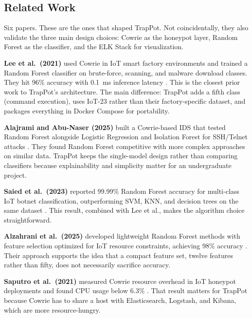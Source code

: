 \subsection{Related Work}
\label{sub:related_work1}

Six papers. These are the ones that shaped TrapPot. Not coincidentally, they also validate the three main design choices: Cowrie as the honeypot layer, Random Forest as the classifier, and the ELK Stack for visualization.

\textbf{Lee et al.\ (2021)} used Cowrie in IoT smart factory environments and trained a Random Forest classifier on brute-force, scanning, and malware download classes. They hit 96\% accuracy with 0.1~ms inference latency \cite{lee2021classification}. This is the closest prior work to TrapPot's architecture. The main difference: TrapPot adds a fifth class (command execution), uses IoT-23 rather than their factory-specific dataset, and packages everything in Docker Compose for portability.

\textbf{Alajrami and Abu-Naser (2025)} built a Cowrie-based IDS that tested Random Forest alongside Logistic Regression and Isolation Forest for SSH/Telnet attacks \cite{alajrami2025aipowered}. They found Random Forest competitive with more complex approaches on similar data. TrapPot keeps the single-model design rather than comparing classifiers because explainability and simplicity matter for an undergraduate project.

\textbf{Saied et al.\ (2023)} reported 99.99\% Random Forest accuracy for multi-class IoT botnet classification, outperforming SVM, KNN, and decision trees on the same dataset \cite{saied2023comparative}. This result, combined with Lee et al., makes the algorithm choice straightforward.

\textbf{Alzahrani et al.\ (2025)} developed lightweight Random Forest methods with feature selection optimized for IoT resource constraints, achieving 98\% accuracy \cite{alzahrani2025lightweight}. Their approach supports the idea that a compact feature set, twelve features rather than fifty, does not necessarily sacrifice accuracy.

\textbf{Saputro et al.\ (2021)} measured Cowrie resource overhead in IoT honeypot deployments and found CPU usage below 6.3\% \cite{9359711}. That result matters for TrapPot because Cowrie has to share a host with Elasticsearch, Logstash, and Kibana, which are more resource-hungry.

